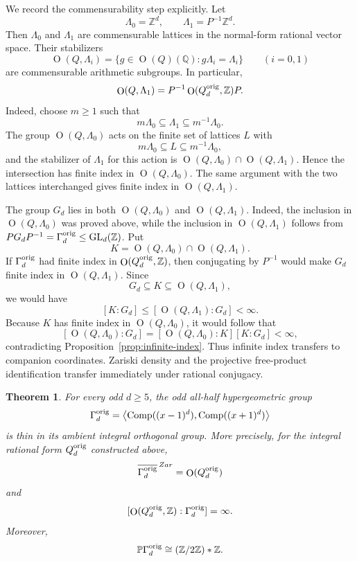\documentclass[a4paper,11pt]{amsart}
\newtheorem{theorem}{Theorem}[section]
\theoremstyle{remark}
\newcommand{\Z}{\mathbb Z}
\newcommand{\Q}{\mathbb Q}
\newcommand{\PP}{\mathbb P}
\DeclareMathOperator{\Comp}{Comp}
\DeclareMathOperator{\GL}{GL}
\DeclareMathOperator{\Ogrp}{O}
\numberwithin{equation}{section}
\begin{document}
We record the commensurability step explicitly.  Let
\[
        \Lambda_0=\Z^d,
        \qquad
        \Lambda_1=P^{-1}\Z^d.
\]
Then \(\Lambda_0\) and \(\Lambda_1\) are commensurable lattices in the normal-form rational vector space.  Their stabilizers
\[
        \Ogrp(Q,\Lambda_i)=\{g\in\Ogrp(Q)(\Q):g\Lambda_i=\Lambda_i\}
        \qquad(i=0,1)
\]
are commensurable arithmetic subgroups.  In particular,
\[
        \Ogrp(Q,\Lambda_1)=P^{-1}\Ogrp(Q_d^{\rm orig},\Z)P.
\]
Indeed, choose \(m\ge1\) such that
\[
        m\Lambda_0\subseteq\Lambda_1\subseteq m^{-1}\Lambda_0.
\]
The group \(\Ogrp(Q,\Lambda_0)\) acts on the finite set of lattices \(L\) with
\[
        m\Lambda_0\subseteq L\subseteq m^{-1}\Lambda_0,
\]
and the stabilizer of \(\Lambda_1\) for this action is \(\Ogrp(Q,\Lambda_0)\cap\Ogrp(Q,\Lambda_1)\).  Hence the intersection has finite index in \(\Ogrp(Q,\Lambda_0)\).  The same argument with the two lattices interchanged gives finite index in \(\Ogrp(Q,\Lambda_1)\).

The group \(G_d\) lies in both \(\Ogrp(Q,\Lambda_0)\) and \(\Ogrp(Q,\Lambda_1)\).  Indeed, the inclusion in \(\Ogrp(Q,\Lambda_0)\) was proved above, while the inclusion in \(\Ogrp(Q,\Lambda_1)\) follows from \(P G_dP^{-1}=\Gamma_d^{\rm orig}\leq\GL_d(\Z)\).  Put
\[
        K=\Ogrp(Q,\Lambda_0)\cap\Ogrp(Q,\Lambda_1).
\]
If \(\Gamma_d^{\rm orig}\) had finite index in \(\Ogrp(Q_d^{\rm orig},\Z)\), then conjugating by \(P^{-1}\) would make \(G_d\) finite index in \(\Ogrp(Q,\Lambda_1)\).  Since
\[
        G_d\subseteq K\subseteq\Ogrp(Q,\Lambda_1),
\]
we would have
\[
        [K:G_d]\leq[\Ogrp(Q,\Lambda_1):G_d]<\infty.
\]
Because \(K\) has finite index in \(\Ogrp(Q,\Lambda_0)\), it would follow that
\[
        [\Ogrp(Q,\Lambda_0):G_d]
        =
        [\Ogrp(Q,\Lambda_0):K][K:G_d]<\infty,
\]
contradicting Proposition~\ref{prop:infinite-index}.  Thus infinite index transfers to companion coordinates.  Zariski density and the projective free-product identification transfer immediately under rational conjugacy.

\begin{theorem}\label{thm:main}
For every odd \(d\ge5\), the odd all-half hypergeometric group
\[
        \Gamma_d^{\rm orig}
        =
        \left\langle
        \Comp((x-1)^d),\Comp((x+1)^d)
        \right\rangle
\]
is thin in its ambient integral orthogonal group.  More precisely, for the integral rational form \(Q_d^{\rm orig}\) constructed above,
\[
        \overline{\Gamma_d^{\rm orig}}^{\,Zar}
        =
        \Ogrp(Q_d^{\rm orig})
\]
and
\[
        [\Ogrp(Q_d^{\rm orig},\Z):\Gamma_d^{\rm orig}]=\infty.
\]
Moreover,
\[
        \PP\Gamma_d^{\rm orig}\cong(\Z/2\Z)*\Z.
\]
\end{theorem}
\end{document}
